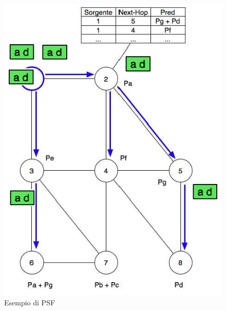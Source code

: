 \begin{figure}
\centering
\includegraphics[scale=0.5]{img/psf.png}
\caption{Esempio di PSF}\label{img:psf}
\end{figure}
